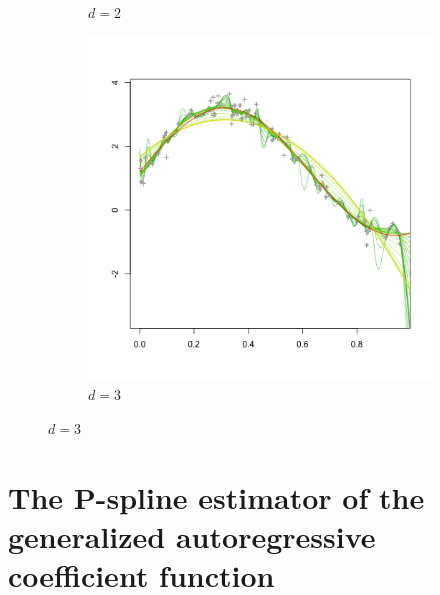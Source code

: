 \begin{figure}[H]
\begin{subfigure}{.5\textwidth}
\caption{$d=2$}
\end{subfigure}
\begin{subfigure}{.5\textwidth}
  \centering
   \graphicspath{{img/}}
  \includegraphics[scale=0.5]{PS_penalty_section_figure_6_order_3.png}
\caption{$d=3$}
\end{subfigure}
\end{figure}





\section{The P-spline estimator of the generalized autoregressive coefficient function}


